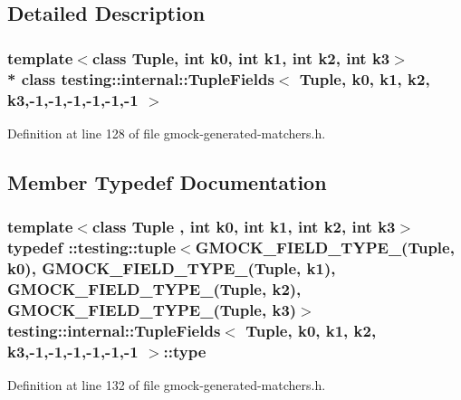 \subsection{Detailed Description}
\subsubsection*{template$<$class Tuple, int k0, int k1, int k2, int k3$>$\\*
class testing\+::internal\+::\+Tuple\+Fields$<$ Tuple, k0, k1, k2, k3,-\/1,-\/1,-\/1,-\/1,-\/1,-\/1 $>$}



Definition at line 128 of file gmock-\/generated-\/matchers.\+h.



\subsection{Member Typedef Documentation}
\subsubsection[{\texorpdfstring{type}{type}}]{\setlength{\rightskip}{0pt plus 5cm}template$<$class Tuple , int k0, int k1, int k2, int k3$>$ typedef \+::testing\+::tuple$<${\bf G\+M\+O\+C\+K\+\_\+\+F\+I\+E\+L\+D\+\_\+\+T\+Y\+P\+E\+\_\+}(Tuple, k0), {\bf G\+M\+O\+C\+K\+\_\+\+F\+I\+E\+L\+D\+\_\+\+T\+Y\+P\+E\+\_\+}(Tuple, k1), {\bf G\+M\+O\+C\+K\+\_\+\+F\+I\+E\+L\+D\+\_\+\+T\+Y\+P\+E\+\_\+}(Tuple, k2), {\bf G\+M\+O\+C\+K\+\_\+\+F\+I\+E\+L\+D\+\_\+\+T\+Y\+P\+E\+\_\+}(Tuple, k3)$>$ {\bf testing\+::internal\+::\+Tuple\+Fields}$<$ Tuple, k0, k1, k2, k3,-\/1,-\/1,-\/1,-\/1,-\/1,-\/1 $>$\+::{\bf type}}\hypertarget{classtesting_1_1internal_1_1_tuple_fields_3_01_tuple_00_01k0_00_01k1_00_01k2_00_01k3_00-1_00-1_00-1_00-1_00-1_00-1_01_4_a9e082889b5cbbbc44c95a2cec23d4646}{}\label{classtesting_1_1internal_1_1_tuple_fields_3_01_tuple_00_01k0_00_01k1_00_01k2_00_01k3_00-1_00-1_00-1_00-1_00-1_00-1_01_4_a9e082889b5cbbbc44c95a2cec23d4646}


Definition at line 132 of file gmock-\/generated-\/matchers.\+h.



